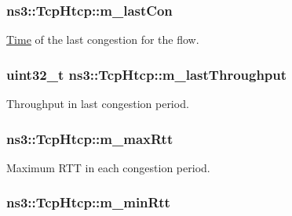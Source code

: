 \subsubsection[{\texorpdfstring{m\+\_\+last\+Con}{m_lastCon}}]{ ns3\+::\+Tcp\+Htcp\+::m\+\_\+last\+Con\hspace{0.3cm}{\ttfamily [private]}}\hypertarget{classns3_1_1TcpHtcp_a108362f874fef6c8a2ecb3941c74e340}{}\label{classns3_1_1TcpHtcp_a108362f874fef6c8a2ecb3941c74e340}


\hyperlink{classns3_1_1Time}{Time} of the last congestion for the flow. 

\subsubsection[{\texorpdfstring{m\+\_\+last\+Throughput}{m_lastThroughput}}]{\setlength{\rightskip}{0pt plus 5cm}uint32\+\_\+t ns3\+::\+Tcp\+Htcp\+::m\+\_\+last\+Throughput\hspace{0.3cm}{\ttfamily [private]}}\hypertarget{classns3_1_1TcpHtcp_a5961ae9da66b8f4b0af86a83ba7c0481}{}\label{classns3_1_1TcpHtcp_a5961ae9da66b8f4b0af86a83ba7c0481}


Throughput in last congestion period. 

\subsubsection[{\texorpdfstring{m\+\_\+max\+Rtt}{m_maxRtt}}]{ ns3\+::\+Tcp\+Htcp\+::m\+\_\+max\+Rtt\hspace{0.3cm}{\ttfamily [private]}}\hypertarget{classns3_1_1TcpHtcp_a91edf7c0c42f5996d3d066ce98551c31}{}\label{classns3_1_1TcpHtcp_a91edf7c0c42f5996d3d066ce98551c31}


Maximum R\+TT in each congestion period. 

\subsubsection[{\texorpdfstring{m\+\_\+min\+Rtt}{m_minRtt}}]{ ns3\+::\+Tcp\+Htcp\+::m\+\_\+min\+Rtt\hspace{0.3cm}{\ttfamily [private]}}\hypertarget{classns3_1_1TcpHtcp_a0cfba062b9ea4dddf100bde861e2265b}{}\label{classns3_1_1TcpHtcp_a0cfba062b9ea4dddf100bde861e2265b}


